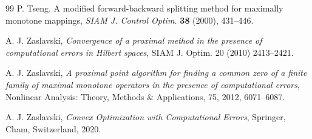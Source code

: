\documentclass[12pt]{article}
\theoremstyle{plain}
\begin{document}
\begin{thebibliography}{99}
 {\sc P. Tseng}. A modified forward-backward splitting method for maximally monotone
mappings, {\it SIAM J. Control Optim.} {\bf 38} (2000), 431--446.

{ {\sc A. J. Zaslavski}, {\it  Convergence of a proximal method in the presence of computational errors in Hilbert spaces}, SIAM J. Optim. 20 (2010) 2413--2421.}

{ {\sc  A. J. Zaslavski},  {\it A proximal point algorithm for finding a common zero of a finite family of maximal monotone operators in the presence of computational errors}, Nonlinear Analysis: Theory, Methods \& Applications, 75, 2012, 6071--6087.}

{ {\sc A. J. Zaslavski}, {\it Convex Optimization with Computational Errors}, Springer, Cham, Switzerland, 2020.}
\end{thebibliography}
\end{document}
